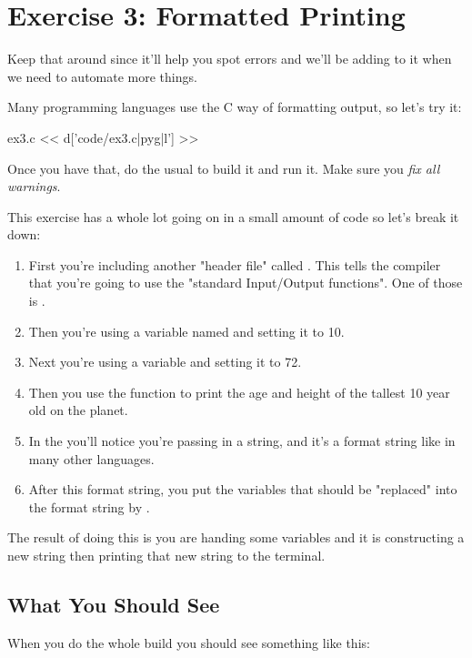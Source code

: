 \chapter{Exercise 3: Formatted Printing}

Keep that  around since it'll help you spot errors
and we'll be adding to it when we need to automate more things.

Many programming languages use the C way of formatting output, so let's try it:

\begin{code}{ex3.c}
<< d['code/ex3.c|pyg|l'] >>
\end{code}

Once you have that, do the usual  to build it and run it. 
Make sure you \emph{fix all warnings}.

This exercise has a whole lot going on in a small amount of code so 
let's break it down:

\begin{enumerate}
\item First you're including another "header file" called . This tells the compiler that you're going to use the "standard Input/Output functions".  One of those is .
\item Then you're using a variable named  and setting it to 10.
\item Next you're using a variable  and setting it to 72.
\item Then you use the  function to print the age and height
     of the tallest 10 year old on the planet.
\item In the  you'll notice you're passing in a string, and
    it's a format string like in many other languages.
\item After this format string, you put the variables that should be 
    "replaced" into the format string by .
\end{enumerate}

The result of doing this is you are handing  some variables
and it is constructing a new string then printing that new string to the
terminal.

\section{What You Should See}

When you do the whole build you should see something like this:

